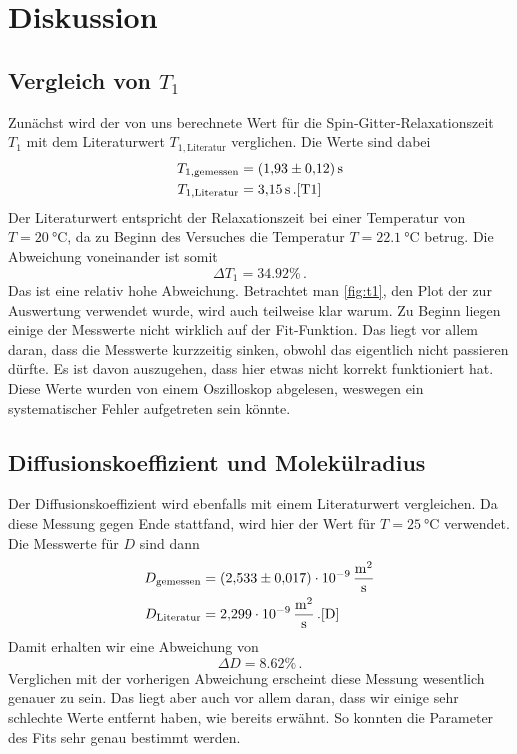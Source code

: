 \section{Diskussion}
\label{sec:Diskussion}

\subsection{Vergleich von \texorpdfstring{$T_1$}{T1}}

Zunächst wird der von uns berechnete Wert für die Spin‐Gitter‐Relaxationszeit $T_1$ mit dem Literaturwert $T_{1,\text{Literatur}}$ verglichen. 
Die Werte sind dabei 
\begin{align*}
    T_{1,\text{gemessen}} &= \SI{1.93(12)}{\second} \\
    T_{1,\text{Literatur}} &= \SI{3.15}{\second} \, . \text{\cite{T1}}
\end{align*}
Der Literaturwert entspricht der Relaxationszeit bei einer Temperatur von $T = \SI{20}{\celsius}$, da zu Beginn des Versuches die Temperatur 
$T = \SI{22.1}{\celsius}$ betrug.
Die Abweichung voneinander ist somit
\begin{equation*}
    \Delta T_1 = \num{34.92} \% \, .
\end{equation*}
Das ist eine relativ hohe Abweichung.
Betrachtet man \autoref{fig:t1}, den Plot der zur Auswertung verwendet wurde, wird auch teilweise klar warum.
Zu Beginn liegen einige der Messwerte nicht wirklich auf der Fit-Funktion.
Das liegt vor allem daran, dass die Messwerte kurzzeitig sinken, obwohl das eigentlich nicht passieren dürfte.
Es ist davon auszugehen, dass hier etwas nicht korrekt funktioniert hat. 
Diese Werte wurden von einem Oszilloskop abgelesen, weswegen ein systematischer Fehler aufgetreten sein könnte.

\subsection{Diffusionskoeffizient und Molekülradius}

Der Diffusionskoeffizient wird ebenfalls mit einem Literaturwert vergleichen. 
Da diese Messung gegen Ende stattfand, wird hier der Wert für $T = \SI{25}{\celsius}$ verwendet. 
Die Messwerte für $D$ sind dann
\begin{align*}
    D_\text{gemessen} &= \SI{2.533(17)e-9}{\meter\squared\per\second} \\
    D_\text{Literatur} &= \SI{2.299e-9}{\meter\squared\per\second} \, . \text{\cite{D}}
\end{align*}
Damit erhalten wir eine Abweichung von 
\begin{equation*}
    \Delta D = \num{8.62} \% \, .
\end{equation*}
Verglichen mit der vorherigen Abweichung erscheint diese Messung wesentlich genauer zu sein. 
Das liegt aber auch vor allem daran, dass wir einige sehr schlechte Werte entfernt haben, wie bereits erwähnt. 
So konnten die Parameter des Fits sehr genau bestimmt werden.

